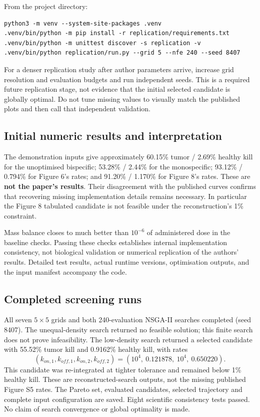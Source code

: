 \documentclass[11pt,a4paper]{article}
\begin{document}
From the project directory:
\begin{verbatim}
python3 -m venv --system-site-packages .venv
.venv/bin/python -m pip install -r replication/requirements.txt
.venv/bin/python -m unittest discover -s replication -v
.venv/bin/python replication/run.py --grid 5 --nfe 240 --seed 8407
\end{verbatim}
For a denser replication study after author parameters arrive, increase grid resolution and evaluation budgets and run independent seeds. This is a required future replication stage, not evidence that the initial selected candidate is globally optimal. Do not tune missing values to visually match the published plots and then call that independent validation.

\subsection{Initial numeric results and interpretation}
The demonstration inputs give approximately 60.15\% tumor / 2.69\% healthy kill for the unoptimised bispecific; 53.28\% / 2.44\% for the monospecific; 93.12\% / 0.794\% for Figure 6's rates; and 91.20\% / 1.170\% for Figure 8's rates. These are \textbf{not the paper's results}. Their disagreement with the published curves confirms that recovering missing implementation details remains necessary. In particular the Figure 8 tabulated candidate is not feasible under the reconstruction's 1\% constraint.

Mass balance closes to much better than $10^{-6}$ of administered dose in the baseline checks. Passing these checks establishes internal implementation consistency, not biological validation or numerical replication of the authors' results. Detailed test results, actual runtime versions, optimisation outputs, and the input manifest accompany the code.

\subsection{Completed screening runs}
All seven $5\times5$ grids and both 240-evaluation NSGA-II searches completed (seed 8407). The unequal-density search returned no feasible solution; this finite search does not prove infeasibility. The low-density search returned a selected candidate with 55.52\% tumor kill and 0.9162\% healthy kill, with rates
\[
(k_{on,1},k_{off,1},k_{on,2},k_{off,2})
=(10^4,\ 0.121878,\ 10^4,\ 0.650220).
\]
This candidate was re-integrated at tighter tolerance and remained below 1\% healthy kill. These are reconstructed-search outputs, not the missing published Figure S5 rates. The Pareto set, evaluated candidates, selected trajectory and complete input configuration are saved. Eight scientific consistency tests passed. No claim of search convergence or global optimality is made.
\end{document}

